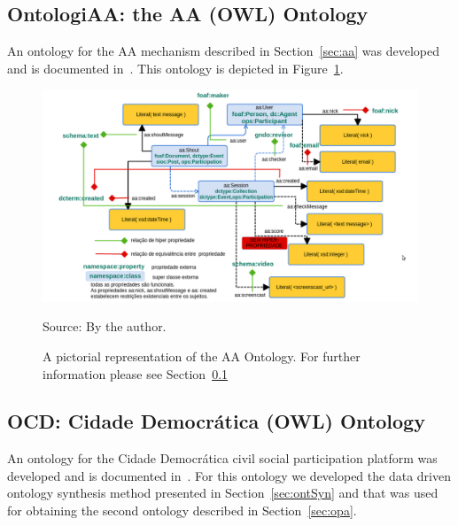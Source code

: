 \begin{apendicesenv}
\subsection{OntologiAA: the AA (OWL) Ontology}\label{sec:ontologiaa}
An ontology for the AA mechanism described in Section~\ref{sec:aa} was developed and is documented in~\cite{opa}.
This ontology is depicted in Figure~\ref{fig:aaOn}.
\begin{figure}[h!]
\begin{center}
\includegraphics[scale=.3]{figs/ontologiaa}
\caption{A pictorial representation of the AA Ontology.
	For further information please see Section~\ref{sec:ontologiaa}}
\label{fig:aaOn}
\begin{flushleft}\footnotesize
Source: By the author.\
\end{flushleft}
\end{center}
\end{figure}

\subsection{OCD: Cidade Democrática (OWL) Ontology}
An ontology for the Cidade Democrática civil social participation platform was developed and is documented in~\cite{opa,ocd}.
For this ontology we developed the data driven ontology synthesis method presented in Section~\ref{sec:ontSyn}
and that was used for obtaining the second ontology described in Section~\ref{sec:opa}.


\end{apendicesenv}
